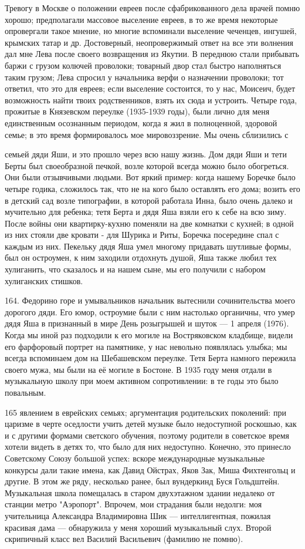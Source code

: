 Тревогу в Москве о положении евреев после сфабрикованного дела врачей помню хорошо; предполагали массовое выселение евреев, в то же время некоторые опровергали такое мнение, но многие вспоминали выселение чеченцев, ингушей, крымских татар и др. Достоверный, неопровержимый ответ на все эти волнения дал мне Лева после своего возвращения из Якутии. В переднюю стали прибывать баржи с грузом колючей проволоки; товарный двор стал быстро наполняться таким грузом; Лева спросил у начальника верфи о назначении проволоки; тот ответил, что это для евреев; если выселение состоится, то у нас, Моисеич, будет возможность найти твоих родственников, взять их сюда и устроить. Четыре года, прожитые в Князевском переулке (1935-1939 годы), были лично для меня единственным осознанным периодом, когда я жил в полноценной, здоровой семье; в это время формировалось мое мировоззрение. Мы очень сблизились с

семьей дяди Яши, и это прошло через всю нашу жизнь. Дом дяди Яши и тети Берты был своеобразной печкой, возле которой всегда можно было обогреться. Они были отзывчивыми людьми. Вот яркий пример: когда нашему Боречке было четыре годика, сложилось так, что не на кого было оставлять его дома; возить его в детский сад возле типографии, в которой работала Инна, было очень далеко и мучительно для ребенка; тетя Берта и дядя Яша взяли его к себе на всю зиму. После войны они квартирку-кухню поменяли на две комнатки с кухней; в одной из них стояли две кровати - для Шурика и Риты, Боречка посередине спал с каждым из них. Пекельку дядя Яша умел многому придавать шутливые формы, был он остроумен, к ним заходили отдохнуть душой, Яша также любил тех хулиганить, что сказалось и на нашем сыне, мы его получили с набором хулиганских стишков.

164. Федорино горе и умывальников начальник вытеснили сочинительства моего дорогого дяди. Его юмор, остроумие были с ним настолько органичны, что умер дядя Яша в признанный в мире День розыгрышей и шуток — 1 апреля (1976). Когда мы иной раз подходили к его могиле на Востряковском кладбище, видели его фарфоровый портрет на памятнике, у нас невольно появлялась улыбка; мы всегда вспоминаем дом на Шебашевском переулке. Тетя Берта намного пережила своего мужа, мы были на её могиле в Бостоне. В 1935 году меня отдали в музыкальную школу при моем активном сопротивлении: в те годы это было повальным.

165 явлением в еврейских семьях; аргументация родительских поколений: при царизме в черте оседлости учить детей музыке было недоступной роскошью, как и с другими формами светского обучения, поэтому родители в советское время хотели видеть в детях то, что было для них недоступно. Конечно, это принесло Советскому Союзу большой успех: вскоре международные музыкальные конкурсы дали такие имена, как Давид Ойстрах, Яков Зак, Миша Фихтенгольц и другие. В этом же ряду, несколько ранее, был вундеркинд Буся Гольдштейн. Музыкальная школа помещалась в старом двухэтажном здании недалеко от станции метро "Аэропорт". Впрочем, мои страдания были недолги: моя учительница Александра Владимировна Шик — интеллигентная, пожилая красивая дама — обнаружила у меня хороший музыкальный слух. Второй скрипичный класс вел Василий Васильевич (фамилию не помню).

